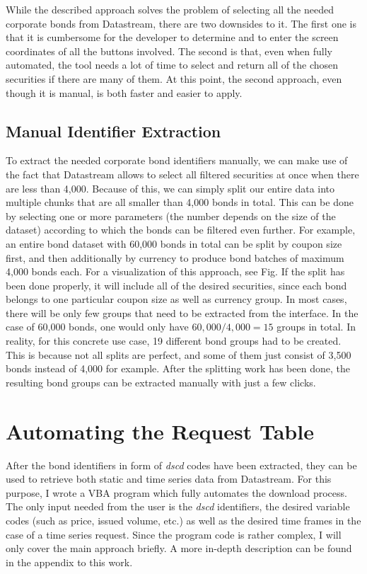 While the described approach solves the problem of selecting all the needed corporate bonds from Datastream, there are two downsides to it. The first one is that it is cumbersome for the developer to determine and to enter the screen coordinates of all the buttons involved. The second is that, even when fully automated, the tool needs a lot of time to select and return all of the chosen securities if there are many of them. At this point, the second approach, even though it is manual, is both faster and easier to apply. 

\subsection{Manual Identifier Extraction}
To extract the needed corporate bond identifiers manually, we can make use of the fact that Datastream allows to select all filtered securities at once when there are less than 4,000. Because of this, we can simply split our entire data into multiple chunks that are all smaller than 4,000 bonds in total. This can be done by selecting one or more parameters (the number depends on the size of the dataset) according to which the bonds can be filtered even further. For example, an entire bond dataset with 60,000 bonds in total can be split by coupon size first, and then additionally by currency to produce bond batches of maximum 4,000 bonds each. For a visualization of this approach, see Fig. %
If the split has been done properly, it will include all of the desired securities, since each bond belongs to one particular coupon size as well as currency group. In most cases, there will be only few groups that need to be extracted from the interface. In the case of 60,000 bonds, one would only have $60,000 / 4,000 = 15$ groups in total. In reality, for this concrete use case, 19 different bond groups had to be created. This is because not all splits are perfect, and some of them just consist of 3,500 bonds instead of 4,000 for example. After the splitting work has been done, the resulting bond groups can be extracted manually with just a few clicks. 

\section{Automating the Request Table}
After the bond identifiers in form of \textit{dscd} codes have been extracted, they can be used to retrieve both static and time series data from Datastream. For this purpose, I wrote a VBA program which fully automates the download process. The only input needed from the user is the \textit{dscd }identifiers, the desired variable codes (such as price, issued volume, etc.) as well as the desired time frames in the case of a time series request. Since the program code is rather complex, I will only cover the main approach briefly. A more in-depth description can be found in the appendix to this work. %

